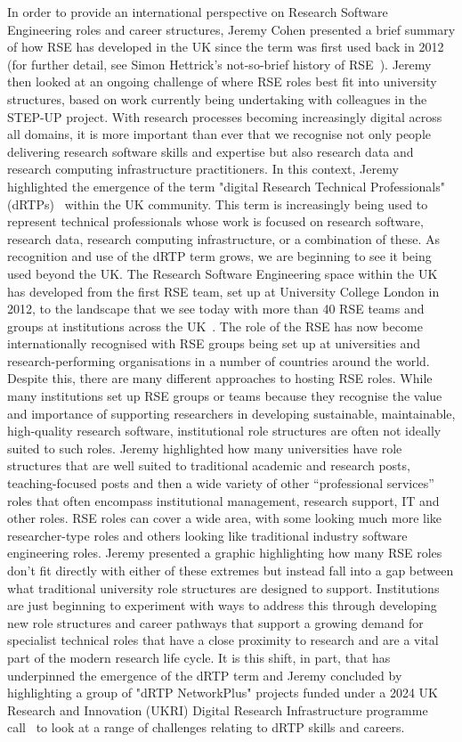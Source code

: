 \documentclass{eceasst}
\begin{document}
In order to provide an international perspective on Research Software Engineering roles and career structures,
Jeremy Cohen presented a brief summary of how RSE has developed in the UK since the term was first used back in 2012
(for further detail, see Simon Hettrick's not-so-brief history of RSE~\cite{Hettrick:2016}).
Jeremy then looked at an ongoing challenge of where RSE roles best fit into university structures,
based on work currently being undertaking with colleagues in the STEP-UP project.
With research processes becoming increasingly digital across all domains, it is more important than ever that we recognise
not only people delivering research software skills and expertise but also research data and research computing infrastructure practitioners.
In this context, Jeremy highlighted the emergence of the term "digital Research Technical Professionals" (dRTPs)~\cite{STEP-UP:2025} within the UK community.
This term is increasingly being used to represent technical professionals whose work is focused on research software, research data,
research computing infrastructure, or a combination of these. As recognition and use of the dRTP term grows, we are beginning to see it being
used beyond the UK.
The Research Software Engineering space within the UK has developed from the first RSE team, set up at University College London in 2012,
to the landscape that we see today with more than 40 RSE teams and groups at institutions across the UK~\cite{SocRSE:2019}.
The role of the RSE has now become internationally recognised with RSE groups being set up at universities and research-performing
organisations in a number of countries around the world.
Despite this, there are many different approaches to hosting RSE roles.
While many institutions set up RSE groups or teams because they recognise the value and importance of
supporting researchers in developing sustainable, maintainable, high-quality research software,
institutional role structures are often not ideally suited to such roles.
Jeremy highlighted how many universities have role structures that are well suited to traditional academic and research posts,
teaching-focused posts and then a wide variety of other ``professional services'' roles that often encompass institutional management,
research support, IT and other roles.
RSE roles can cover a wide area, with some looking much more like researcher-type roles and others looking like
traditional industry software engineering roles.
Jeremy presented a graphic highlighting how many RSE roles don't fit directly with either of these extremes but instead fall into a
gap between what traditional university role structures are designed to support.
Institutions are just beginning to experiment with ways to address this through developing new role structures and career pathways
that support a growing demand for specialist technical roles that have a close proximity to research and are a vital part of the modern research life cycle.
It is this shift, in part, that has underpinned the emergence of the dRTP term and Jeremy concluded by highlighting a group of "dRTP NetworkPlus" projects
funded under a 2024 UK Research and Innovation (UKRI) Digital Research Infrastructure programme call~\cite{UKRI:2024}
to look at a range of challenges relating to dRTP skills and careers.
\end{document}
